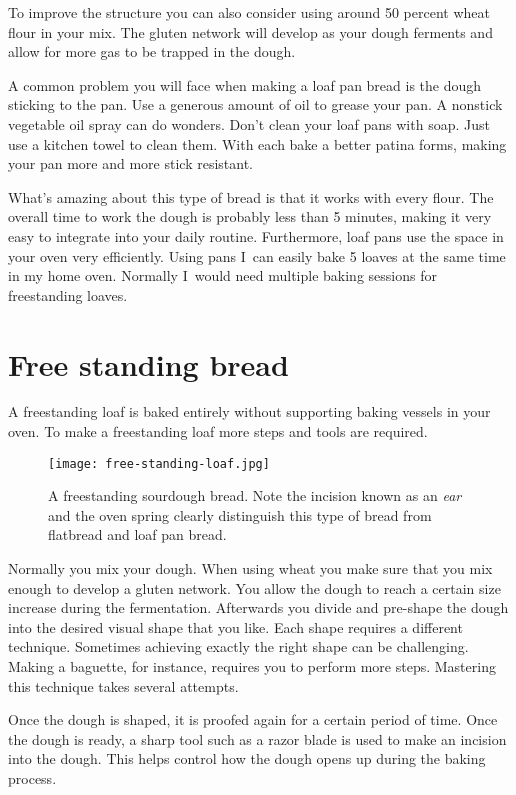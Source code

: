To improve the structure you can also consider using around 50 percent
wheat flour in your mix. The gluten network will develop as your
dough ferments and allow for more gas to be trapped in the dough.

A common problem you will face when making a loaf pan bread is
the dough sticking to the pan. Use a generous amount of oil to grease
your pan. A nonstick vegetable oil spray can do wonders.
Don't clean your loaf pans with soap. Just use a kitchen towel
to clean them. With each bake a better patina forms, making your
pan more and more stick resistant.

What's amazing about this type of bread is that it works
with every flour. The overall time to work the dough is probably
less than 5 minutes, making it very easy to integrate
into your daily routine. Furthermore, loaf pans use the space
in your oven very efficiently. Using pans I~can
easily bake 5 loaves at the same time in my home oven.
Normally I~would need multiple baking sessions for
freestanding loaves.

\section{Free standing bread}

A freestanding loaf is baked entirely without supporting
baking vessels in your oven. To make a freestanding loaf more steps
and tools are required.

\begin{figure}[!htb]
  \texttt{[image: free-standing-loaf.jpg]}
  \centering
  \caption{A freestanding sourdough bread. Note the incision known as an
      \emph{ear} and the oven spring clearly
  distinguish this type of bread from flatbread and loaf pan bread.}
\end{figure}

Normally you mix your dough. When using wheat you make sure
that you mix enough to develop a gluten network.
You allow the dough to reach
a certain size increase during the fermentation. Afterwards you divide and pre-shape
the dough into the desired visual shape that you like.
Each shape requires a different technique. Sometimes achieving
exactly the right shape can be challenging. Making a baguette,
for instance, requires you to perform more steps. Mastering this
technique takes several attempts.

Once the dough is shaped, it is proofed again for a certain
period of time. Once the dough is ready, a sharp tool such
as a razor blade is used to make an incision into the dough.
This helps control how the dough opens up during the baking process.

